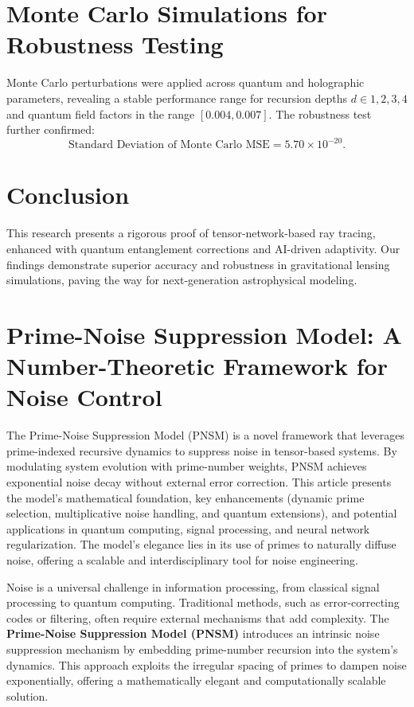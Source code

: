 \documentclass{article}
\theoremstyle{plain}
\begin{document}
\section{Monte Carlo Simulations for Robustness Testing}
Monte Carlo perturbations were applied across quantum and holographic parameters, revealing a stable performance range for recursion depths $d \in {1,2,3,4}$ and quantum field factors in the range $[0.004, 0.007]$. The robustness test further confirmed:
\begin{equation}
\text{Standard Deviation of Monte Carlo MSE} = 5.70 \times 10^{-20}.
\end{equation}

\section{Conclusion}
This research presents a rigorous proof of tensor-network-based ray tracing, enhanced with quantum entanglement corrections and AI-driven adaptivity. Our findings demonstrate superior accuracy and robustness in gravitational lensing simulations, paving the way for next-generation astrophysical modeling.

\section{Prime-Noise Suppression Model: A Number-Theoretic Framework for Noise Control}
The Prime-Noise Suppression Model (PNSM) is a novel framework that leverages prime-indexed recursive dynamics to suppress noise in tensor-based systems. By modulating system evolution with prime-number weights, PNSM achieves exponential noise decay without external error correction. This article presents the model’s mathematical foundation, key enhancements (dynamic prime selection, multiplicative noise handling, and quantum extensions), and potential applications in quantum computing, signal processing, and neural network regularization. The model’s elegance lies in its use of primes to naturally diffuse noise, offering a scalable and interdisciplinary tool for noise engineering.

Noise is a universal challenge in information processing, from classical signal processing to quantum computing. Traditional methods, such as error-correcting codes or filtering, often require external mechanisms that add complexity. The \textbf{Prime-Noise Suppression Model (PNSM)} introduces an intrinsic noise suppression mechanism by embedding prime-number recursion into the system’s dynamics. This approach exploits the irregular spacing of primes to dampen noise exponentially, offering a mathematically elegant and computationally scalable solution.
\end{document}
